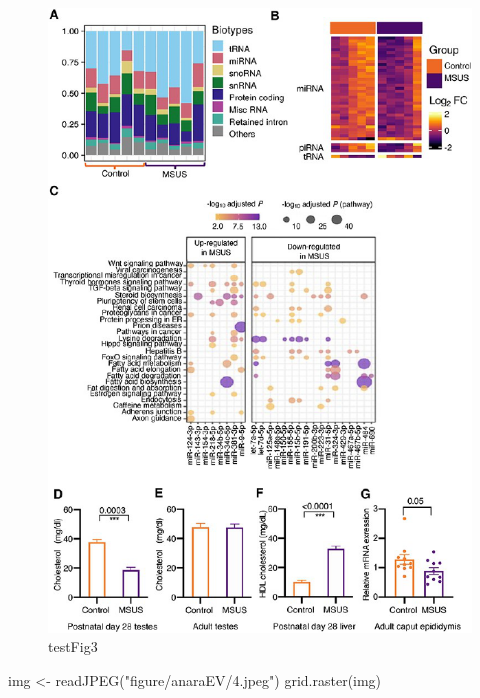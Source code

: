\documentclass[12pt,twoside]{reedthesis}
\newenvironment{Shaded}{\begin{snugshade}}{\end{snugshade}}
\newcommand{\FunctionTok}[1]{\textcolor[rgb]{0.00,0.00,0.00}{#1}}
\newcommand{\NormalTok}[1]{#1}
\newcommand{\OtherTok}[1]{\textcolor[rgb]{0.56,0.35,0.01}{#1}}
\newcommand{\StringTok}[1]{\textcolor[rgb]{0.31,0.60,0.02}{#1}}
\begin{document}
\begin{figure}

{\centering \includegraphics{thesis_files/figure-latex/fig3-1} 

}

\caption{testFig3}\label{fig:fig3}
\end{figure}
\begin{Shaded}
\begin{Highlighting}[]
\NormalTok{img }\OtherTok{\textless{}{-}} \FunctionTok{readJPEG}\NormalTok{(}\StringTok{"figure/anaraEV/4.jpeg"}\NormalTok{)}
\FunctionTok{grid.raster}\NormalTok{(img)}
\end{Highlighting}
\end{Shaded}
\end{document}
